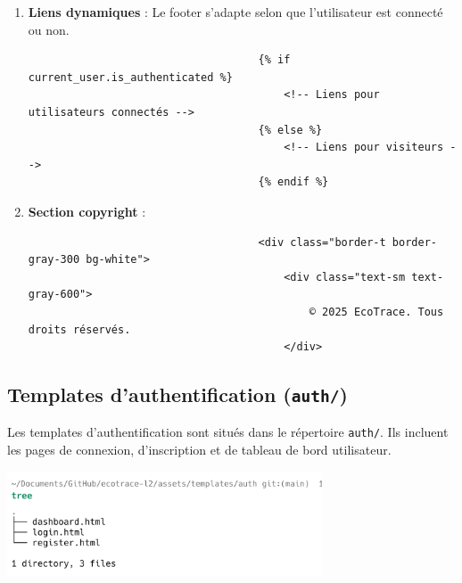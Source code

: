 \documentclass[a4paper,11pt]{article}
\begin{document}
                    \begin{enumerate}
                        \item \textbf{Liens dynamiques} : Le footer s'adapte selon que l'utilisateur est connecté ou non.
                            \begin{tcolorbox}[colback=lightgray!6, colframe=black, left=-60mm, right=5mm, top=2mm, bottom=0mm, boxrule=0.1mm]
                                \begin{verbatim}
                                    {% if current_user.is_authenticated %}
                                        <!-- Liens pour utilisateurs connectés -->
                                    {% else %}
                                        <!-- Liens pour visiteurs -->
                                    {% endif %}
                                \end{verbatim}
                            \end{tcolorbox}

                        \item \textbf{Section copyright} :
                            \begin{tcolorbox}[colback=lightgray!6, colframe=black, left=-60mm, right=5mm, top=2mm, bottom=0mm, boxrule=0.1mm]
                                \begin{verbatim}
                                    <div class="border-t border-gray-300 bg-white">
                                        <div class="text-sm text-gray-600">
                                            © 2025 EcoTrace. Tous droits réservés.
                                        </div>
                                \end{verbatim}
                            \end{tcolorbox}
                    \end{enumerate}

            \subsection{Templates d'authentification (\texttt{auth/})}
                \noindent Les templates d'authentification sont situés dans le répertoire \texttt{auth/}. Ils incluent les pages de connexion, d'inscription et de tableau de bord utilisateur.

                \begin{center}
                    \includegraphics[width=0.7\textwidth]{captures/templates_et_static/templates/auth/auth.png}
                \end{center}
\end{document}
